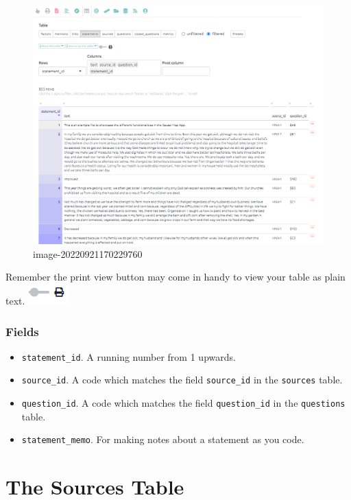 \documentclass[
]{book}
\providecommand{\tightlist}{%
  \setlength{\itemsep}{0pt}\setlength{\parskip}{0pt}}
\begin{document}
\begin{figure}
\centering
\includegraphics[width=6.77083in,height=\textheight]{_assets/image-20220921170229760.png}
\caption{image-20220921170229760}
\end{figure}

Remember the print view button may come in handy to view your table as plain text. \includegraphics{_assets/image-20220921170450911.png}

\hypertarget{fields-4}{%
\subsection{Fields}\label{fields-4}}

\begin{itemize}
\tightlist
\item
  \texttt{statement\_id}. A running number from 1 upwards.
\item
  \texttt{source\_id}. A code which matches the field \texttt{source\_id} in the \texttt{sources} table.
\item
  \texttt{question\_id}. A code which matches the field \texttt{question\_id} in the \texttt{questions} table.
\item
  \texttt{statement\_memo}. For making notes about a statement as you code.
\end{itemize}

\hypertarget{xthe-sources-table-old}{%
\chapter{The Sources Table}\label{xthe-sources-table-old}}
\end{document}
